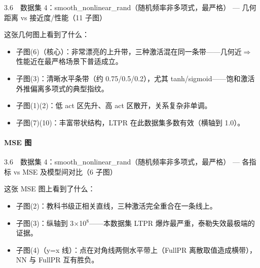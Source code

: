 \documentclass[UTF8,a4paper,11pt]{ctexart}
\begin{document}
3.6　数据集 4：smooth\_nonlinear\_rand（随机频率非多项式，最严格） --- 几何距离 vs 接近度/性能（11 子图）

这张几何图上看到了什么：

\begin{itemize}
\item 子图(6)（核心）：非常漂亮的上升带，三种激活混在同一条带------几何近$\Rightarrow$性能近在最严格场景下普适成立。
\end{itemize}

\begin{itemize}
\item 子图(3)：清晰水平条带（约 0.75/0.5/0.2），尤其 tanh/sigmoid------饱和激活外推偏离多项式的典型指纹。
\end{itemize}

\begin{itemize}
\item 子图(1)(2)：低 act 区先升、高 act 区散开，关系复杂非单调。
\end{itemize}

\begin{itemize}
\item 子图(7)(10)：丰富带状结构，LTPR 在此数据集多数有效（横轴到 1.0）。
\end{itemize}

\paragraph{MSE 图}

3.6　数据集 4：smooth\_nonlinear\_rand（随机频率非多项式，最严格） --- 各指标 vs MSE 及模型间对比（6 子图）

这张 MSE 图上看到了什么：

\begin{itemize}
\item 子图(2)：教科书级正相关直线，三种激活完全重合在一条线上。
\end{itemize}

\begin{itemize}
\item 子图(3)：纵轴到 3$\times$10$^8$------本数据集 LTPR 爆炸最严重，泰勒失效最极端的证据。
\end{itemize}

\begin{itemize}
\item 子图(4)（y=x 线）：点在对角线两侧水平带上（FullPR 离散取值造成横带），NN 与 FullPR 互有胜负。
\end{itemize}
\end{document}
